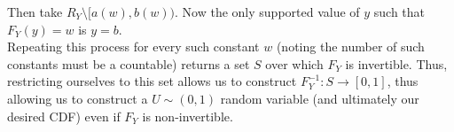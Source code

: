 \documentclass[paper=a4, fontsize=11pt]{scrartcl} %
\numberwithin{equation}{section} %
\numberwithin{figure}{section} %
\numberwithin{table}{section} %
\begin{document}
Then take $R_Y \setminus [a(w),b(w))$. Now the only supported value of $y$ such that $F_Y(y) = w$ is $y = b$. \\

Repeating this process for every such constant $w$ (noting the number of such constants must be a countable) returns a set $S$ over which $F_Y$ is invertible. Thus, restricting ourselves to this set allows us to construct $F_Y^{-1}: S\rightarrow [0,1]$, thus allowing us to construct a $U \sim (0,1)$ random variable (and ultimately our desired CDF) even if $F_Y$ is non-invertible.

\end{document}
